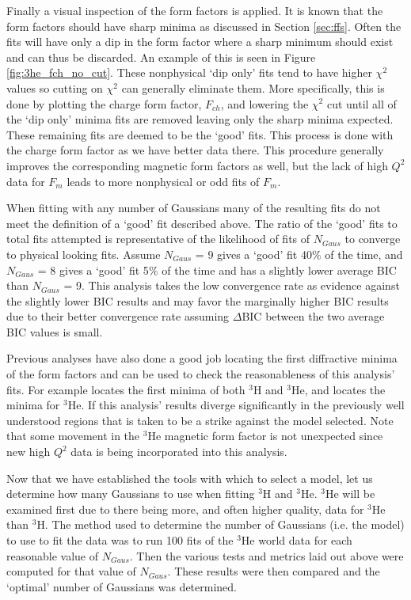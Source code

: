 Finally a visual inspection of the form factors is applied. It is known that the form factors should have sharp minima as discussed in Section \ref{sec:ffs}. Often the fits will have only a dip in the form factor where a sharp minimum should exist and can thus be discarded. An example of this is seen in Figure \ref{fig:3he_fch_no_cut}. These nonphysical `dip only' fits tend to have higher $\chi^2$ values so cutting on $\chi^2$ can generally eliminate them. More specifically, this is done by plotting the charge form factor, $F_{ch}$, and lowering the $\chi^2$ cut until all of the `dip only' minima fits are removed leaving only the sharp minima expected. These remaining fits are deemed to be the `good' fits. This process is done with the charge form factor as we have better data there. This procedure generally improves the corresponding magnetic form factors as well, but the lack of high $Q^2$ data for $F_m$ leads to more nonphysical or odd fits of $F_m$.

When fitting with any number of Gaussians many of the resulting fits do not meet the definition of a `good' fit described above. The ratio of the `good' fits to total fits attempted is representative of the likelihood of fits of $N_{Gaus}$ to converge to physical looking fits. Assume $N_{Gaus}$ = 9 gives a `good' fit 40$\%$ of the time, and $N_{Gaus}$ = 8 gives a `good' fit 5$\%$ of the time and has a slightly lower average BIC than $N_{Gaus}$ = 9. This analysis takes the low convergence rate as evidence against the slightly lower BIC results and may favor the marginally higher BIC results due to their better convergence rate assuming $\Delta$BIC between the two average BIC values is small. 

Previous analyses have also done a good job locating the first diffractive minima of the form factors and can be used to check the reasonableness of this analysis' fits. For example \cite{Article:Amroun} locates the first minima of both $^3$H and $^3$He, and \cite{Article:Alex} locates the minima for $^3$He. If this analysis' results diverge significantly in the previously well understood regions that is taken to be a strike against the model selected. Note that some movement in the $^3$He magnetic form factor is not unexpected since new high $Q^2$ data is being incorporated into this analysis.

Now that we have established the tools with which to select a model, let us determine how many Gaussians to use when fitting $^3$H and $^3$He. $^3$He will be examined first due to there being more, and often higher quality, data for $^3$He than $^3$H. The method used to determine the number of Gaussians (i.e. the model) to use to fit the data was to run 100 fits of the $^3$He world data for each reasonable value of $N_{Gaus}$. Then the various tests and metrics laid out above were computed for that value of $N_{Gaus}$. These results were then compared and the `optimal' number of Gaussians was determined.


